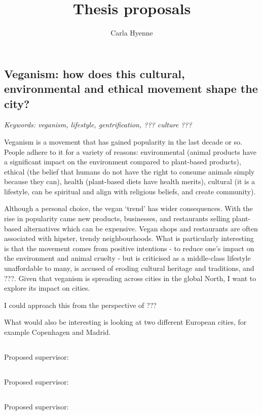 \documentclass{article}
\title{Thesis proposals}
\author{Carla Hyenne}
\date{}
\begin{document}
\maketitle

\subsection{Veganism: how does this cultural, environmental and ethical movement shape the city?}

\textit{Keywords: veganism, lifestyle, gentrification, ??? culture ???}

Veganism is a movement that has gained popularity in the last decade or so. People adhere to it for a variety of reasons: environmental (animal products have a significant impact on the environment compared to plant-based products), ethical (the belief that humans do not have the right to consume animals simply because they can), health (plant-based diets have health merits), cultural (it is a lifestyle, can be spiritual and align with religious beliefs, and create community). 

Although a personal choice, the vegan `trend' has wider consequences. With the rise in popularity came new products, businesses, and restaurants selling plant-based alternatives which can be expensive. Vegan shops and restaurants are often associated with hipster, trendy neighbourhoods. 
What is particularly interesting is that the movement comes from positive intentions - to reduce one's impact on the environment and animal cruelty - but is criticised as a middle-class lifestyle unaffordable to many, is accused of eroding cultural heritage and traditions, and ???. Given that veganism is spreading across cities in the global North, I want to explore its impact on cities.

I could approach this from the perspective of ???

What would also be interesting is looking at two different European cities, for example Copenhagen and Madrid. 

\subsection{}

Proposed supervisor:

\subsection{}

Proposed supervisor:

\subsection{}

Proposed supervisor:
\end{document}
